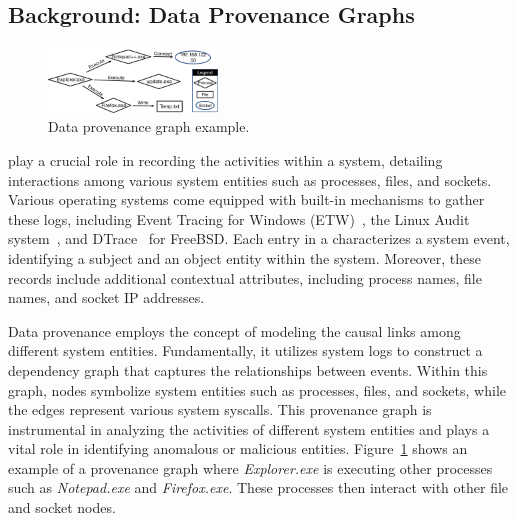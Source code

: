 
\subsection{Background: Data Provenance Graphs}

\begin{figure}[t!]
  \centering
  \includegraphics[width=0.4\textwidth]{fig/provexp.pdf}
  \caption{Data provenance graph example.}

  \label{provexp}
  \vspace{-2ex}
\end{figure}


\Logs play a crucial role in recording the activities within a system, detailing interactions among various system entities such as processes, files, and sockets. Various operating systems come equipped with built-in mechanisms to gather these logs, including Event Tracing for Windows (ETW)~\cite{windowsaudit}, the Linux Audit system~\cite{linuxaudit}, and DTrace~\cite{dtrace} for FreeBSD. Each entry in a \logs characterizes a system event, identifying a subject and an object entity within the system. Moreover, these records include additional contextual attributes, including process names, file names, and socket IP addresses.

Data provenance employs the concept of modeling the causal links among different system entities. Fundamentally, it utilizes system logs to construct a dependency graph that captures the relationships between events. Within this graph, nodes symbolize system entities such as processes, files, and sockets, while the edges represent various system syscalls. This provenance graph is instrumental in analyzing the activities of different system entities and plays a vital role in identifying anomalous or malicious entities. Figure~\ref{provexp} shows an example of a provenance graph where \textit{Explorer.exe} is executing other processes such as \textit{Notepad.exe} and \textit{Firefox.exe}. These processes then interact with other file and socket nodes.

